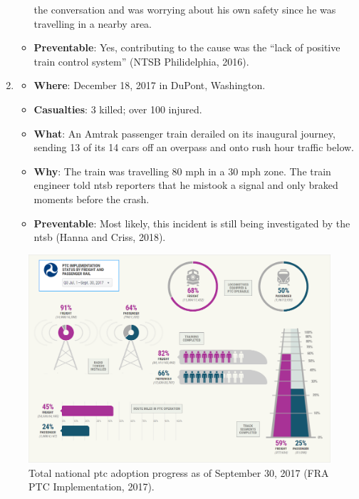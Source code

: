 \documentclass[11pt, titlepage]{article}
\begin{document}
\begin{enumerate}
\begin{itemize}
        the conversation and was worrying about his own safety since he was
        travelling in a nearby area.
        \item \textbf{Preventable}: Yes, contributing to the cause was the ``lack
        of positive train control system'' (NTSB Philidelphia, 2016).
    \end{itemize}
    \item
    \begin{itemize}
        \item \textbf{Where}: December 18, 2017 in DuPont, Washington.
        \item \textbf{Casualties}: 3 killed; over 100 injured.
        \item \textbf{What}: An Amtrak passenger train derailed on its inaugural
        journey, sending 13 of its 14 cars off an overpass and onto rush hour
        traffic below.
        \item \textbf{Why}: The train was travelling 80 mph in a 30 mph zone. The
        train engineer told \gls{ntsb} reporters that he mistook a signal and
        only braked moments before the crash.
        \item \textbf{Preventable}: Most likely, this incident is still being
        investigated by the \gls{ntsb} (Hanna and Criss, 2018).
    \end{itemize}
\end{enumerate}

\begin{figure}[ht]
    \begin{center}
        \includegraphics[width=\textwidth]{PTCAdoption.png}
        \captionsetup{justification=centering}
        \caption[National PTC Adoption]{Total national \gls{ptc} adoption progress as
        of September 30, 2017 (FRA PTC Implementation, 2017).}
        \label{adoption}
    \end{center}
\end{figure}
\end{document}
